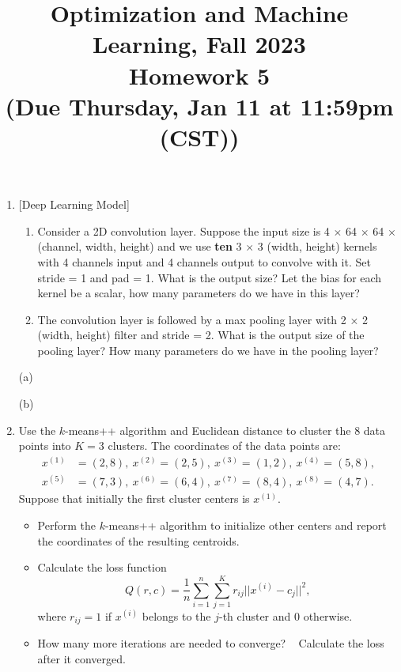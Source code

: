 \documentclass[10pt]{article}
\begin{document}
\date{}
\title{Optimization and Machine Learning, Fall 2023 \\
	Homework 5 \\
	\small (Due Thursday, Jan 11 at 11:59pm (CST))}
\maketitle
\begin{enumerate}[1.]

	\item {} [Deep Learning Model]
	\begin{enumerate}
		\item Consider a 2D convolution layer. Suppose the input size is 4 $\times$ 64 $\times$ 64 $\times$ (channel, width, height) and
		we use \textbf{ten} 3 $\times$ 3 (width, height) kernels with 4 channels input and 4 channels output to convolve with it. Set stride = 1 and pad = 1. What is 
		the output size? Let the bias for each kernel be a scalar, how many parameters do we have in this layer? 
		\item The convolution layer is followed by a max pooling layer with 2 × 2 (width, height) filter and stride
		= 2. What is the output size of the pooling layer? How many parameters do we have in the pooling
		layer? 
	\end{enumerate}
	
(a)





(b)


	
	
	
	
	
	
	\newpage


	\item {} Use the $k$-means++ algorithm and Euclidean distance to cluster the 8 data points into $K=3$ clusters.
	      The coordinates of the data points are:
	      \begin{align*}
		      x^{(1)} & = (2,8),  \ x^{(2)} = (2,5), \ x^{(3)} = (1,2), \ x^{(4)} = (5,8), \\
		      x^{(5)} & = (7,3),  \ x^{(6)} = (6,4), \ x^{(7)} = (8,4), \ x^{(8)} = (4,7).
	      \end{align*}
	      Suppose that initially the first cluster centers is $x^{(1)}$.
	      \begin{itemize}
		      \item[(a)] Perform the $k$-means++ algorithm to initialize other centers and report the coordinates of the resulting centroids. ~
		      \item[(b)] Calculate the loss function
		            \begin{equation}
			            Q(r,c) = \frac{1}{n} \sum_{i=1}^n \sum_{j=1}^K r_{ij}||x^{(i)} - c_j||^2,
		            \end{equation}
		            where $r_{ij} = 1$ if $x^{(i)}$ belongs to the $j$-th cluster and 0 otherwise. ~
		      \item[(c)] How many more iterations are needed to converge? ~ Calculate the loss after it converged.~
	      \end{itemize}
		

\end{enumerate}
\end{document}
